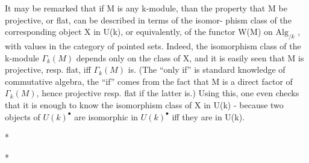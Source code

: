 
It may be remarked that if M is any k-module,  than the property
that M be projective,  or flat,  can be described in terms of the isomor-%
phism class of the corresponding object X in U(k)\hand{$^\bullet$},  or equivalently, of
the functor W(M) on $\mathrm{Alg}_{/k}$ ,  with values in the category of pointed sets.
Indeed, the isomorphism class of the k-module $\Gamma_k(M)$  depends only on the
class of X,  and it is easily seen that M is projective, resp. flat, iff
$\Gamma_k(M)$ is.  (The ``only if'' is standard knowledge of commutative algebra,
the ``if'' comes from the fact that M is a direct factor of $\Gamma_k(M)$,  hence
projective resp. flat if the latter is.)  Using this,  one even checks
that it is enough to know the isomorphism class of X in U(k)  -  because
two objects of $U(k)^\bullet$  are isomorphic in $U(k)^\bullet$  iff they are in U(k).

* \quad *

*

